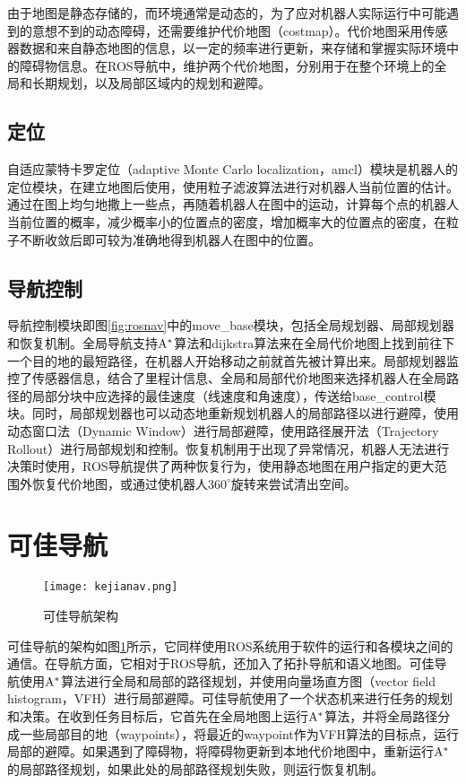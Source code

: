   由于地图是静态存储的，而环境通常是动态的，为了应对机器人实际运行中可能遇到的意想不到的动态障碍，还需要维护代价地图（costmap）。代价地图采用传感器数据和来自静态地图的信息，以一定的频率进行更新，来存储和掌握实际环境中的障碍物信息。在ROS导航中，维护两个代价地图，分别用于在整个环境上的全局和长期规划，以及局部区域内的规划和避障。

\subsection{定位}
  自适应蒙特卡罗定位（adaptive Monte Carlo localization，amcl）模块是机器人的定位模块，在建立地图后使用，使用粒子滤波算法进行对机器人当前位置的估计。通过在图上均匀地撒上一些点，再随着机器人在图中的运动，计算每个点的机器人当前位置的概率，减少概率小的位置点的密度，增加概率大的位置点的密度，在粒子不断收敛后即可较为准确地得到机器人在图中的位置。

\subsection{导航控制}

  导航控制模块即图\ref{fig:rosnav}中的move\_base模块，包括全局规划器、局部规划器和恢复机制。全局导航支持${\rm A}^\ast$算法和dijkstra算法来在全局代价地图上找到前往下一个目的地的最短路径，在机器人开始移动之前就首先被计算出来。局部规划器监控了传感器信息，结合了里程计信息、全局和局部代价地图来选择机器人在全局路径的局部分块中应选择的最佳速度（线速度和角速度），传送给base\_control模块。同时，局部规划器也可以动态地重新规划机器人的局部路径以进行避障，使用动态窗口法（Dynamic Window）\cite{fox1997dynamic}进行局部避障，使用路径展开法（Trajectory Rollout）\cite{gerkey2008planning}进行局部规划和控制。恢复机制用于出现了异常情况，机器人无法进行决策时使用，ROS导航提供了两种恢复行为，使用静态地图在用户指定的更大范围外恢复代价地图，或通过使机器人$360^{\circ}$旋转来尝试清出空间。

\section{可佳导航}

\begin{figure}[htb]
  \centering
  \texttt{[image: kejianav.png]}
  \caption{可佳导航架构}
  \label{fig:kejianav}
\end{figure}

  可佳导航的架构如图\ref{fig:kejianav}所示，它同样使用ROS系统用于软件的运行和各模块之间的通信。在导航方面，它相对于ROS导航，还加入了拓扑导航和语义地图。可佳导航使用${\rm A}^\ast$算法进行全局和局部的路径规划，并使用向量场直方图（vector field histogram，VFH）\cite{borenstein1991vector}进行局部避障。可佳导航使用了一个状态机来进行任务的规划和决策。在收到任务目标后，它首先在全局地图上运行${\rm A}^\ast$算法，并将全局路径分成一些局部目的地（waypoints），将最近的waypoint作为VFH算法的目标点，运行局部的避障。如果遇到了障碍物，将障碍物更新到本地代价地图中，重新运行${\rm A}^\ast$的局部路径规划，如果此处的局部路径规划失败，则运行恢复机制\cite{liu2017wrighteagle}。
